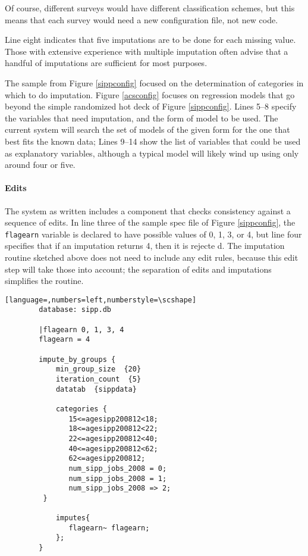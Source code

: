 \documentclass{article}
\begin{document}
        Of course, different surveys would have different classification schemes, but
        this means that each survey would need a new configuration file, not new code.

        Line eight indicates that five imputations are to be done for each missing
        value. Those with extensive experience with multiple imputation often advise
        that a handful of imputations are sufficient for most purposes.

        The sample from
        Figure \ref{sippconfig} focused on the determination of categories in which to
        do imputation. Figure \ref{acsconfig} focuses on regression models that go
        beyond the simple randomized hot deck of Figure \ref{sippconfig}. Lines 5--8
        specify the variables that need imputation, and the form of model to be used.
        The current system will search the set of models of the given form for the one
        that best fits the known data; Lines 9--14 show the list of variables that could be
        used as explanatory variables, although a typical model will likely wind up
        using only around four or five.

     \paragraph{Edits} The system as written includes a component that checks consistency
        against a sequence of edits. In line three of the sample spec file of Figure
        \ref{sippconfig}, the {\tt flagearn} variable is declared to have possible values of 0,
        1, 3, or 4, but line four specifies that if an imputation returns 4, then it is rejecte
d.
        The imputation routine sketched above does not need to include any edit rules, because
        this edit step will take those into account; the separation of edits and imputations
        simplifies the routine.
        \begin{lstlisting}[language=,numbers=left,numberstyle=\scshape]
        database: sipp.db

        |flagearn 0, 1, 3, 4
        flagearn = 4

        impute_by_groups {
            min_group_size  {20}
            iteration_count  {5}
            datatab  {sippdata}

            categories {
               15<=agesipp200812<18;
               18<=agesipp200812<22;
               22<=agesipp200812<40;
               40<=agesipp200812<62;
               62<=agesipp200812;
               num_sipp_jobs_2008 = 0;
               num_sipp_jobs_2008 = 1;
               num_sipp_jobs_2008 => 2;
         }

            imputes{
               flagearn~ flagearn;
            };
        }
        \end{lstlisting}
\end{document}
